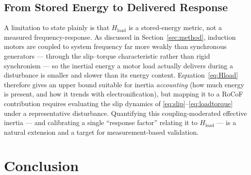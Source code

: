 \documentclass[journal]{IEEEtran}
\begin{document}
\subsection{From Stored Energy to Delivered Response}
A limitation to state plainly is that $H_{\mathrm{load}}$ is a stored-energy
metric, not a measured frequency-response. As discussed in
Section~\ref{sec:method}, induction motors are coupled to system frequency far
more weakly than synchronous generators --- through the slip--torque
characteristic rather than rigid synchronism --- so the inertial energy a motor
load actually delivers during a disturbance is smaller and slower than its
energy content. Equation~\eqref{eq:Hload} therefore gives an upper bound suitable
for inertia \emph{accounting} (how much energy is present, and how it trends with
electronification), but mapping it to a RoCoF contribution requires evaluating
the slip dynamics of \eqref{eq:slip}--\eqref{eq:loadtorque} under a representative
disturbance. Quantifying this coupling-moderated effective inertia --- and
calibrating a single ``response factor'' relating it to $H_{\mathrm{load}}$ --- is
a natural extension and a target for measurement-based validation.


\section{Conclusion}
\label{sec:conclusion}





\end{document}
